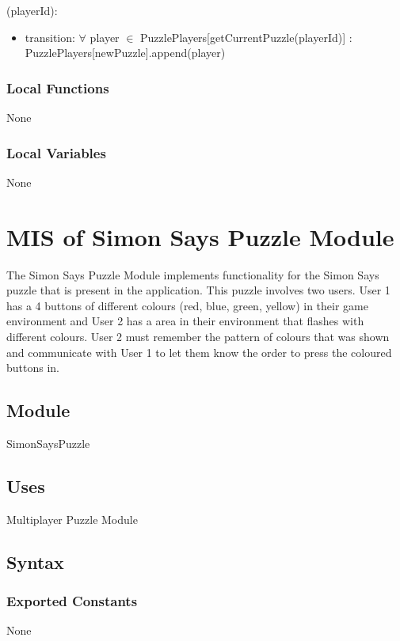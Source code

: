 \documentclass[12pt, titlepage]{article}
\begin{document}
(playerId):
\begin{itemize}
\item transition: $\forall$ player $\in$ PuzzlePlayers[getCurrentPuzzle(playerId)] : \newline PuzzlePlayers[newPuzzle].append(player)
\end{itemize}

\subsubsection{Local Functions}

None

\subsubsection{Local Variables}

None

\newpage

\section{MIS of Simon Says Puzzle Module} \label{Simon}

\noindent The Simon Says Puzzle Module implements functionality for the Simon Says puzzle that is present in the application. This puzzle involves two users. User 1 has a 4 buttons of different colours (red, blue, green, yellow) in their game environment and User 2 has a area in their environment that flashes with different colours. User 2 must remember the pattern of colours that was shown and communicate with User 1 to let them know the order to press the coloured buttons in.

\subsection{Module}
SimonSaysPuzzle

\subsection{Uses}
Multiplayer Puzzle Module

\subsection{Syntax}

\subsubsection{Exported Constants}
None
\end{document}
